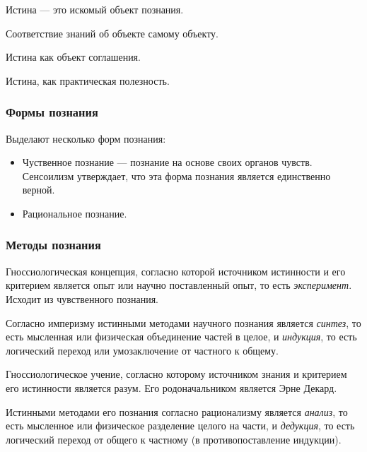 Истина --- это искомый объект познания.

\begin{definition}
	Соответствие знаний об объекте самому объекту.
\end{definition}

\begin{definition}[Конвенциальное]
	Истина как объект соглашения.
\end{definition}

\begin{definition}[Прагматическая]
	Истина, как практическая полезность.
\end{definition}

\subsubsection{Формы познания}

Выделают несколько форм познания:
\begin{itemize}
	\item Чуственное познание --- познание на основе своих органов чувств.
	      Сенсоилизм утверждает, что эта форма познания является единственно верной.
	\item Рациональное познание.
\end{itemize}

\subsubsection{Методы познания}

\begin{definition}[Империзм]
	Гноссиологическая концепция, согласно которой источником истинности и его
	критерием является опыт или научно поставленный опыт, то есть
	\emph{эксперимент}. Исходит из чувственного познания.

	Согласно империзму истинными методами научного познания является
	\emph{синтез}, то есть мысленная или физическая объединение частей в целое, и
	\emph{индукция}, то есть логический переход или умозаключение от частного к
	общему.
\end{definition}

\begin{definition}[Рационализм]
	Гноссиологическое учение, согласно которому источником знания и критерием его
	истинности является разум. Его родоначальником является Эрне Декард.

	Истинными методами его познания согласно рационализму является \emph{анализ},
	то есть мысленное или физическое разделение целого на части, и
	\emph{дедукция}, то есть логический переход от общего к частному (в
	противопоставление индукции).
\end{definition}

